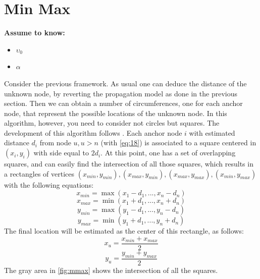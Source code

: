 \documentclass[12pt,twoside]{report}
\begin{document}
\section{Min Max}
  \begin{center}
  \textbf{Assume to know:}
  \begin{itemize}
    \centering
    \item $\upsilon_0$
    \item $\alpha$
  \end{itemize}
  \end{center}
Consider the previous framework. As usual one can deduce the distance of the unknown node, by reverting the propagation model as done in the previous section. Then we can obtain a number of circumferences, one for each anchor node, that represent the possible locations of the unknown node. In this algorithm, however, you need to consider not circles but squares. The development of this algorithm follows \cite{inproceedings}. Each anchor node $i$ with estimated distance $d_i$ from node $u,u>n$ (with \ref{eq:18}) is associated to a square centered in $(x_i,y_i)$ with side equal to $2d_i$. At this point, one has a set of overlapping squares, and can easily find the intersection of all those squares,  which results in a rectangles of vertices $(x_{min},y_{min}), (x_{max},y_{min}), (x_{max},y_{max}), (x_{min},y_{max})$ with the following equations:
\begin{equation}
    x_{min}=\max(x_1-d_1,...,x_n-d_n)
\end{equation}
\begin{equation}
    x_{max}=\min(x_1+d_1,...,x_n+d_n)
\end{equation}
\begin{equation}
    y_{min}=\max(y_1-d_1,...,y_n-d_n)
\end{equation}
\begin{equation}
    y_{max}=\min(y_1+d_1,...,y_n+d_n)
\end{equation}
The final location will be estimated as the center of this rectangle, as follows:
\begin{equation}
    x_u=\frac{x_{min}+x_{max}}{2}
\end{equation}
\begin{equation}
    y_u=\frac{y_{min}+y_{max}}{2}
\end{equation}
The gray area in \ref{fig:mmax} shows the intersection of all the squares.
\end{document}
